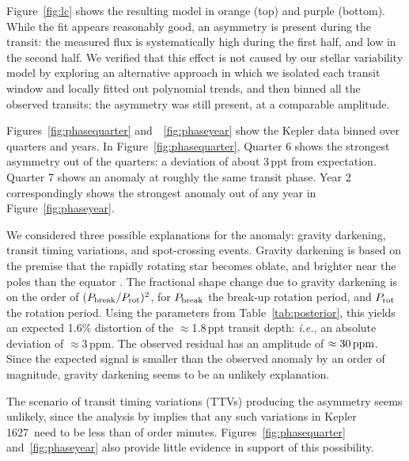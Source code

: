 \documentclass[12pt,modern,twocolumn,tighten]{aastex63}
\newcommand{\sn}{Kepler\,1627} %
\begin{document}
Figure~\ref{fig:lc} shows the resulting model in orange (top) and
purple (bottom).  While the fit appears reasonably good, an asymmetry
is present during the transit: the measured flux is systematically
high during the first half, and low in the second half.  We verified
that this effect is not caused by our stellar variability model by
exploring an alternative approach in which we isolated each transit
window and locally fitted out polynomial trends, and then binned all
the observed transits; the asymmetry was still present, at a
comparable amplitude.

Figures~\ref{fig:phasequarter} and~~\ref{fig:phaseyear} show the
Kepler data binned over quarters and years.  In
Figure~\ref{fig:phasequarter}, Quarter 6 shows the strongest asymmetry
out of the quarters: a deviation of about 3\,ppt from
expectation.  Quarter 7 shows an anomaly at roughly the same transit
phase.  Year 2 correspondingly shows the strongest anomaly out of any
year in Figure~\ref{fig:phaseyear}.

We considered three possible explanations for the anomaly: gravity
darkening, transit timing variations, and spot-crossing events.
Gravity darkening is based on the premise that the rapidly rotating
star becomes oblate, and brighter near the poles than the equator
\citep[{\it e.g.},][]{masuda_spin-orbit_2015}.  The fractional shape
change due to gravity darkening is on the order of $(P_{\rm
break}/P_{\rm rot})^2$, for $P_{\rm break}$ the break-up rotation
period, and $P_{\rm rot}$ the rotation period.  Using the parameters
from Table~\ref{tab:posterior}, this yields an expected 1.6\%
distortion of the $\approx$1.8\,ppt transit depth: {\it i.e.}, an
absolute deviation of $\approx$3\,ppm.  The observed residual has an
amplitude of $\approx 30\,{\rm ppm}$.  Since the expected signal is
smaller than the observed anomaly by an order of magnitude, gravity
darkening seems to be an unlikely explanation.

The scenario of transit timing variations (TTVs) producing the
asymmetry seems unlikely, since the analysis by
\citet{holczer_transit_2016} implies that any such variations in \sn\
need to be less than of order minutes.  Figures~\ref{fig:phasequarter}
and~\ref{fig:phaseyear} also provide little evidence in support of
this possibility.
\end{document}
